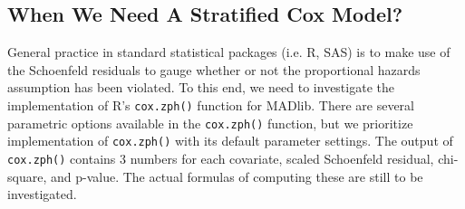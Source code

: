 \subsection{When We Need A Stratified Cox Model?}\label{cox:diagnostic}
General practice in standard statistical packages (i.e. R, SAS) is to make use of the Schoenfeld residuals to gauge whether or not the proportional hazards assumption has been violated.
To this end, we need to investigate the implementation of R's \texttt{cox.zph()} function for MADlib.
There are several parametric options available in the \texttt{cox.zph()} function, but we prioritize implementation of \texttt{cox.zph()} with its default parameter settings.
The output of \texttt{cox.zph()} contains 3 numbers for each covariate, scaled Schoenfeld residual, chi-square, and p-value.
The actual formulas of computing these are still to be investigated.





